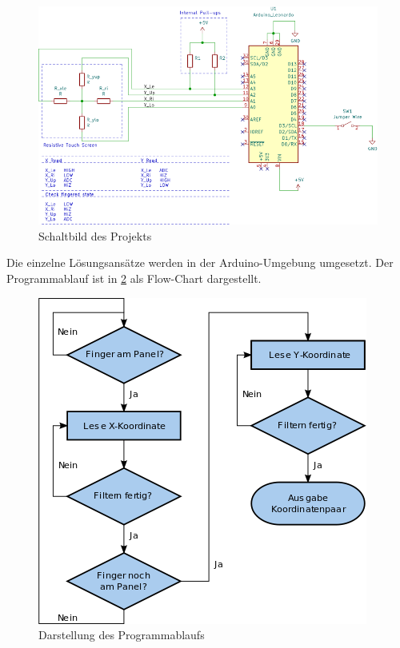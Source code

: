 \begin{figure}[ht!]
    \centering
    \includegraphics[width=\linewidth]{fig/schaltbild.png}
    \caption{Schaltbild des Projekts}
    \label{fig:schaltbild}
\end{figure}
Die einzelne Lösungsansätze werden in der Arduino-Umgebung umgesetzt.
Der Programmablauf ist in \cref{fig:flowchart} als Flow-Chart dargestellt.

\begin{figure}
    \centering
    \includegraphics[scale=0.45]{fig/flow_chart.png}
    \caption{Darstellung des Programmablaufs}
    \label{fig:flowchart}
\end{figure}
